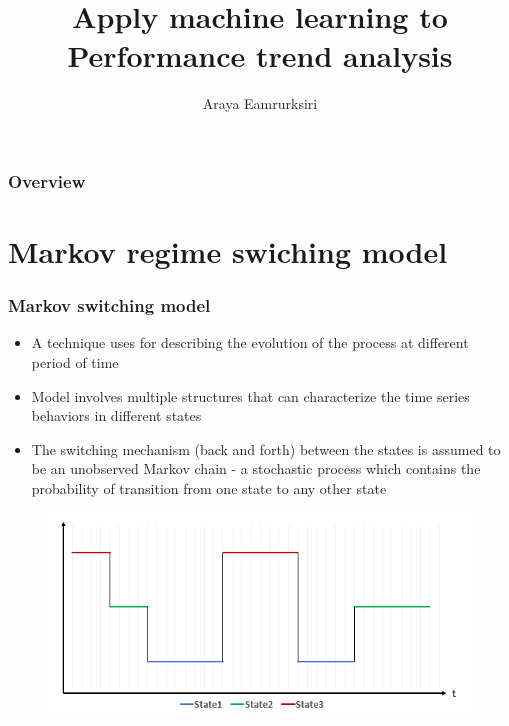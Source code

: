 \documentclass{beamer}
\title[]{Apply machine learning to Performance trend analysis} %
\author{Araya Eamrurksiri} %
\institute[] %
{
 \\ %
\medskip
\textit{} %
}
\date{} %
\begin{document}
\begin{frame}
\titlepage %
\end{frame}

\begin{frame}
\frametitle{Overview} %
\tableofcontents %
\end{frame}

\section{Markov regime swiching model} %

\begin{frame}
\frametitle{Markov switching model}
\begin{itemize}
	\item A technique uses for describing the evolution of the process at different period of time
	\item Model involves multiple structures that can characterize the time series behaviors in different states
	\item The switching mechanism (back and forth) between the states is assumed to be an unobserved Markov chain - a stochastic process which contains the probability of transition from one state to any other state
\end{itemize}

\begin{figure}
	\includegraphics[width=0.5\linewidth]{graph3}
\end{figure}

\end{frame}
\end{document}
